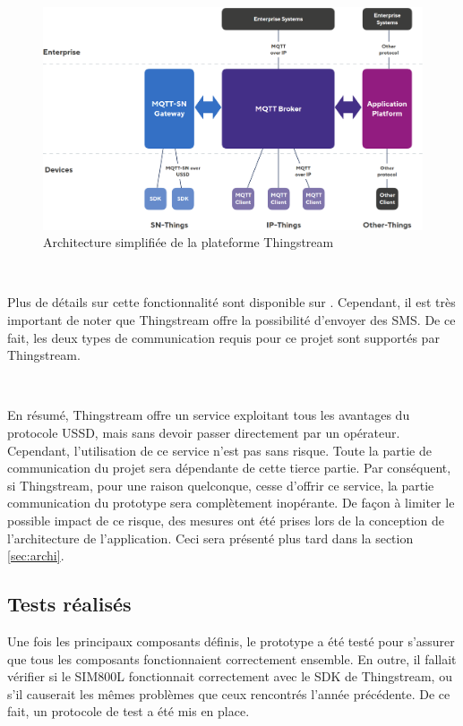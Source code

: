 ~

\begin{figure}[ht!]
  \includegraphics[width=\textwidth]{img/el_prototype/thingstream_archi.png}
  \caption{Architecture simplifiée de la plateforme Thingstream \cite{thing_archi}}
  \label{fig:thing_archi}
\end{figure}
~

\noindent
Plus de détails sur cette fonctionnalité sont disponible sur \cite{thing_dataflow}. Cependant, il est très important de noter que Thingstream offre la possibilité d'envoyer des SMS. De ce fait, les deux types de communication requis pour ce projet sont supportés par Thingstream.

~

\noindent
En résumé, Thingstream offre un service exploitant tous les avantages du protocole USSD, mais sans devoir passer directement par un opérateur. Cependant, l'utilisation de ce service n'est pas sans risque. Toute la partie de communication du projet sera dépendante de cette tierce partie. Par conséquent, si Thingstream, pour une raison quelconque, cesse d'offrir ce service, la partie communication du prototype sera complètement inopérante. De façon à limiter le possible impact de ce risque, des mesures ont été prises lors de la conception de l'architecture de l'application. Ceci sera présenté plus tard dans la section \ref{sec:archi}.

\subsection{Tests réalisés}
\label{sec:prototests}

\noindent
Une fois les principaux composants définis, le prototype a été testé pour s'assurer que tous les composants fonctionnaient correctement ensemble. En outre, il fallait vérifier si le SIM800L fonctionnait correctement avec le SDK de Thingstream, ou s'il causerait les mêmes problèmes que ceux rencontrés l'année précédente. De ce fait, un protocole de test a été mis en place.

